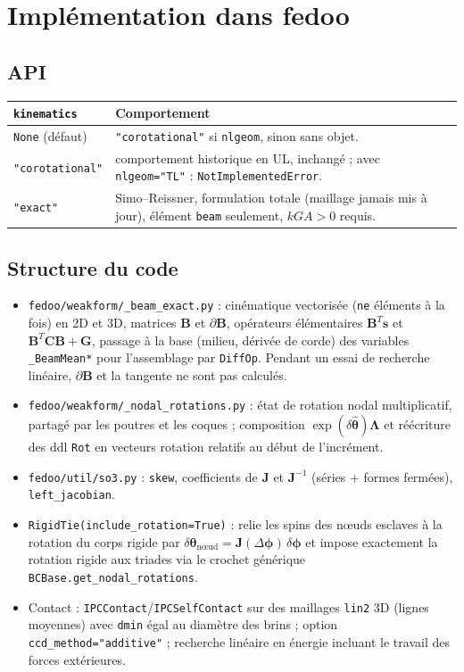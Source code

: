 \documentclass[11pt,a4paper]{article}
\newcommand{\hatv}[1]{\widehat{\bm{#1}}}
\newcommand{\Lam}{\bm{\Lambda}}
\newcommand{\code}[1]{\texttt{#1}}
\begin{document}
\section{Implémentation dans fedoo}

\subsection{API}
\begin{center}
\small
\begin{tabularx}{\linewidth}{>{\raggedright}p{3.2cm}X}
\toprule
\code{kinematics} & Comportement\\
\midrule
\code{None} (défaut) & \code{"corotational"} si \code{nlgeom}, sinon sans objet.\\
\code{"corotational"} & comportement historique en UL, inchangé ; avec \code{nlgeom="TL"} : \code{NotImplementedError}.\\
\code{"exact"} & Simo--Reissner, formulation totale (maillage jamais mis à jour), élément \code{beam} seulement, $kGA>0$ requis.\\
\bottomrule
\end{tabularx}
\end{center}

\subsection{Structure du code}
\begin{itemize}
\item \code{fedoo/weakform/\_beam\_exact.py} : cinématique vectorisée
(\code{ne} éléments à la fois) en 2D et 3D, matrices $\mathbf B$ et
$\partial\mathbf B$, opérateurs élémentaires $\mathbf B^T\mathbf s$ et
$\mathbf B^T\mathbf C\mathbf B+\mathbf G$, passage à la base (milieu, dérivée de
corde) des variables \code{\_BeamMean*} pour l'assemblage par \code{DiffOp}.
Pendant un essai de recherche linéaire, $\partial\mathbf B$ et la tangente ne
sont pas calculés.
\item \code{fedoo/weakform/\_nodal\_rotations.py} : état de rotation nodal
multiplicatif, partagé par les poutres et les coques ; composition
$\exp(\delta\hatv\theta)\Lam$ et réécriture des ddl \code{Rot} en vecteurs
rotation relatifs au début de l'incrément.
\item \code{fedoo/util/so3.py} : \code{skew}, coefficients de $\mathbf J$ et
$\mathbf J^{-1}$ (séries + formes fermées), \code{left\_jacobian}.
\item \code{RigidTie(include\_rotation=True)} : relie les spins des nœuds
esclaves à la rotation du corps rigide par
$\delta\bm\theta_{\text{nœud}}=\mathbf J(\Delta\bm\phi)\,\delta\bm\phi$ et impose
exactement la rotation rigide aux triades via le crochet générique
\code{BCBase.get\_nodal\_rotations}.
\item Contact : \code{IPCContact}/\code{IPCSelfContact} sur des maillages
\code{lin2} 3D (lignes moyennes) avec \code{dmin} égal au diamètre des brins ;
option \code{ccd\_method="additive"} ; recherche linéaire en énergie incluant
le travail des forces extérieures.
\end{itemize}
\end{document}
